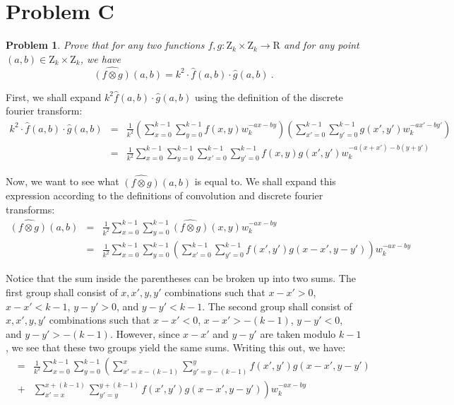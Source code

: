 \documentclass[psamsfonts]{amsart}
\newtheorem{prob}{Problem}[section]
\newenvironment{sol}{{\bfseries Solution}}{\qedsymbol}
\theoremstyle{definition}
\theoremstyle{remark}
\numberwithin{equation}{section}
\begin{document}
\section{Problem C}

\begin{prob}
Prove that for any two
functions $f,g:\mathrm{Z}_{k}\times \mathrm{Z}_{k} \to \mathrm{R}$ and for any
point $(a,b)\in \mathrm{Z}_{k}\times \mathrm{Z}_{k}$, we have
\[
\widehat{(f\otimes g)}(a,b) = k^2\cdot\widehat{f}(a,b)\cdot\widehat{g}(a,b)\ .
\]
\end{prob}

\begin{sol}
First, we shall expand $k^2 \widehat{f}(a,b) \cdot \widehat{g}(a,b)$ using the definition of the discrete fourier transform:
\begin{eqnarray}
k^2\cdot\widehat{f}(a,b)\cdot\widehat{g}(a,b) &=& \frac{1}{k^2} \left( \sum_{x=0}^{k-1} \sum_{y=0}^{k-1} f(x,y) w_k^{-ax-by} \right) \left( \sum_{x'=0}^{k-1} \sum_{y'=0}^{k-1} g(x',y') w_k^{-ax'-by'} \right) \\
&=& \frac{1}{k^2} \sum_{x=0}^{k-1} \sum_{y=0}^{k-1} \sum_{x' = 0}^{k-1} \sum_{y' = 0}^{k-1} f(x,y) g(x',y') w_k^{-a(x+x') - b(y + y')}
\end{eqnarray}

Now, we want to see what $\widehat{(f\otimes g)}(a,b)$ is equal to. We shall expand this expression according to the definitions of convolution and discrete fourier transforms:
\begin{eqnarray}
\widehat{(f\otimes g)}(a,b) &=& \frac{1}{k^2} \sum_{x=0}^{k-1} \sum_{y=0}^{k-1} \widehat{(f\otimes g)}(x,y) w_k^{-ax - by} \\
&=& \frac{1}{k^2} \sum_{x=0}^{k-1} \sum_{y=0}^{k-1} \left( \sum_{x'=0}^{k-1} \sum_{y'=0}^{k-1} f(x',y') g(x-x', y-y') \right) w_k^{-ax-by} 
\end{eqnarray}

Notice that the sum inside the parentheses can be broken up into two sums. The first group shall consist of $x,x',y,y'$ combinations such that $x - x' > 0$, $x - x' < k-1$, $y - y' > 0$, and $y - y' < k -1$. The second group shall consist of $x,x',y,y'$ combinations such that $x - x' < 0$, $x- x' > -(k - 1)$, $y - y' < 0$, and $y - y' > -( k -1)$. However, since $x - x'$ and $y -y'$ are taken modulo $k -1$, we see that these two groups yield the same sums. Writing this out, we have:
\begin{eqnarray}
&=& \frac{1}{k^2} \sum_{x=0}^{k-1} \sum_{y=0}^{k-1} \left( \sum_{x'=x - (k - 1)}^{x} \sum_{y' = y - (k -1)}^{y} f(x',y') g(x - x', y -y') \right. \\
&+& \left. \sum_{x' = x}^{x + (k -1)} \sum_{y' = y}^{y + (k -1)} f(x',y') g(x-x', y-y') \right) w_k^{-ax-by}
\end{eqnarray}  


\end{sol}
\end{document}
